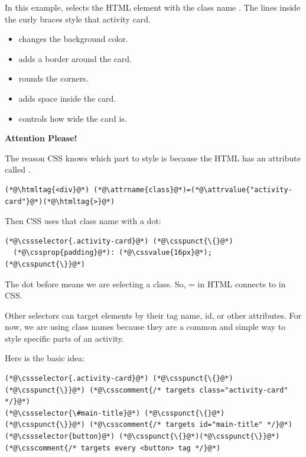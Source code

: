 \documentclass{article}
\begin{document}
In this example,  selects the HTML element with the class name .
The lines inside the curly braces style that activity card.

\begin{itemize}[leftmargin=1.2cm, itemsep=4pt]
  \item {} changes the background color.
  \item {} adds a border around the card.
  \item {} rounds the corners.
  \item {} adds space inside the card.
  \item {} controls how wide the card is.
\end{itemize}

\vspace{0.3cm}


\begin{attentionbox}
  \textbf{\Bitter\textcolor{naranja}{Attention Please!}}

  The reason CSS knows which part to style is because the HTML has an attribute called \textbf{}.

  \begin{lstlisting}
(*@\htmltag{<div}@*) (*@\attrname{class}@*)=(*@\attrvalue{"activity-card"}@*)(*@\htmltag{>}@*)
\end{lstlisting}

  Then CSS uses that class name with a dot:

  \begin{lstlisting}
(*@\cssselector{.activity-card}@*) (*@\csspunct{\{}@*)
  (*@\cssprop{padding}@*): (*@\cssvalue{16px}@*);
(*@\csspunct{\}}@*)
\end{lstlisting}

  The dot before  means we are selecting a class.
  So, = in HTML connects to  in CSS.

  Other selectors can target elements by their tag name, id, or other attributes.
  For now, we are using class names because they are a common and simple way to style specific parts of an activity.

  \vspace{0.15cm}

  Here is the basic idea:

  \begin{lstlisting}
(*@\cssselector{.activity-card}@*) (*@\csspunct{\{}@*)(*@\csspunct{\}}@*) (*@\csscomment{/* targets class="activity-card" */}@*)
(*@\cssselector{\#main-title}@*) (*@\csspunct{\{}@*)(*@\csspunct{\}}@*) (*@\csscomment{/* targets id="main-title" */}@*)
(*@\cssselector{button}@*) (*@\csspunct{\{}@*)(*@\csspunct{\}}@*) (*@\csscomment{/* targets every <button> tag */}@*)
\end{lstlisting}

\end{attentionbox}
\end{document}
